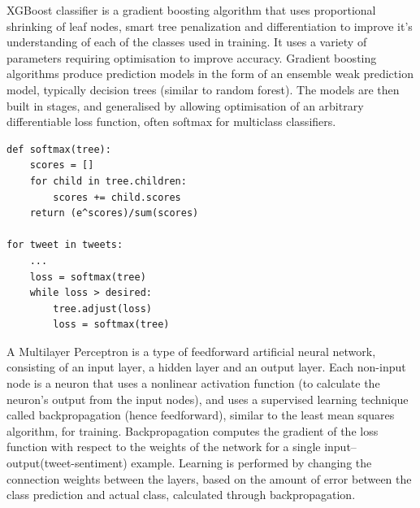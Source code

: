 \documentclass{article}
\begin{document}
XGBoost classifier is a gradient boosting algorithm that uses proportional shrinking of leaf nodes, smart tree penalization and differentiation to improve it's understanding of each of the classes used in training.
It uses a variety of parameters requiring optimisation to improve accuracy.
Gradient boosting algorithms produce prediction models in the form of an ensemble weak prediction model, typically decision trees (similar to random forest).
The models are then built in stages, and generalised by allowing optimisation of an arbitrary differentiable loss function, often softmax for multiclass classifiers\autocite[5]{xgboost}.

\begin{lstlisting}[caption={XGBoost classifier psuedopythoncode},captionpos=b]
def softmax(tree):
	scores = []
	for child in tree.children:
		scores += child.scores
	return (e^scores)/sum(scores)

for tweet in tweets:
	...
	loss = softmax(tree)
	while loss > desired:
		tree.adjust(loss)
		loss = softmax(tree)
\end{lstlisting}

A Multilayer Perceptron is a type of feedforward artificial neural network, consisting of an input layer, a hidden layer and an output layer.
Each non-input node is a neuron that uses a nonlinear activation function (to calculate the neuron's output from the input nodes), and uses a supervised learning technique called backpropagation (hence feedforward), similar to the least mean squares algorithm, for training.
Backpropagation computes the gradient of the loss function with respect to the weights of the network for a single input–output(tweet-sentiment) example.
Learning is performed by changing the connection weights between the layers, based on the amount of error between the class prediction and actual class, calculated through backpropagation\autocite[6]{mp}.
\end{document}
